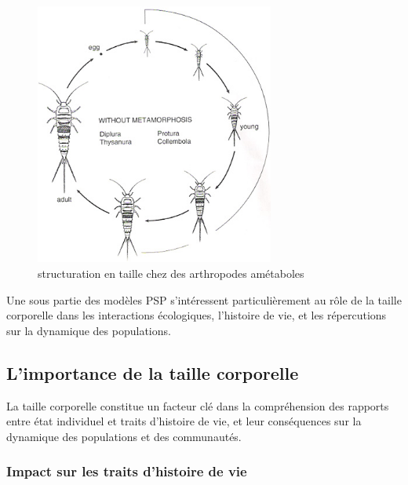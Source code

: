 \begin{figure}[H]
\centering
\includegraphics[width=0.7\textwidth]{1_CorpsDeThese/EA/Fig/bugs1}
\caption[structuration en taille chez des arthropodes amétaboles]{structuration
en taille chez des arthropodes amétaboles}\label{fig:taille}
\end{figure}

Une sous partie des modèles PSP s'intéressent particulièrement au rôle de la
taille corporelle dans les interactions écologiques, l'histoire de vie, et les
répercutions sur la dynamique des populations. 

\subsection{L'importance de la taille corporelle}

La taille corporelle constitue un facteur clé dans la compréhension des rapports
entre état individuel et traits d'histoire de vie, et leur conséquences sur la
dynamique des populations et des communautés. 

\subsubsection{Impact sur les traits d'histoire de vie}

